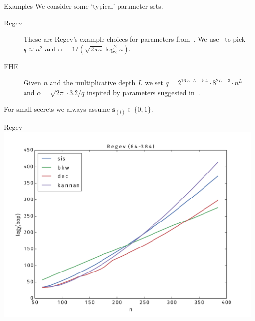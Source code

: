 \documentclass[10pt,compress]{beamer}
\renewcommand{\vec}[1]{\mathbf{#1}\xspace}
\renewcommand{\vec}[1]{\mathbf{#1}\xspace}
\begin{document}
\begin{frame}{Examples}
  We consider some `typical' parameter sets. 

  \begin{description}
  \item[Regev]  
    These are Regev's example choices for parameters from~\cite{DBLP:journals/jacm/Regev09}. 
    We use~\cite{BB:AFCGS13} to pick $q \approx n^2$ and $\alpha = 1/(\sqrt{2\pi n} \log_2^2 n)$. 

  \item[FHE] 
    Given $n$ and the multiplicative depth $L$ we set $q = 2^{16.5\cdot L + 5.4} \cdot 8^{2L-3} \cdot n^L$ 
    and $\alpha = \sqrt{2\pi} \cdot 3.2/q$ inspired by parameters suggested in~\cite{C:GenHalSma12FULL}. 
  \end{description} 
  For small secrets we always assume $\vec{s}_{(i)} \in \{0,1\}$. 

\end{frame}


\begin{frame}{Regev}
  \vspace{-1em}
  \includegraphics[width=1.0\textwidth]{Regev-64-384.pdf}
\end{frame}
\end{document}
